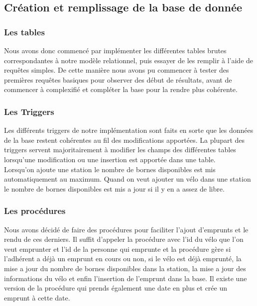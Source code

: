 \documentclass[10pt]{article}
\begin{document}
  \subsection{Création et remplissage de la base de donnée}\label{subsec:crea}
  \subsubsection{Les tables}
  Nous avons donc commencé par implémenter les différentes tables brutes correspondantes à notre modèle relationnel, puis essayer de les remplir à l'aide de requêtes simples. De cette manière nous avons pu commencer à tester des premières requêtes basiques pour observer des début de résultats, avant de commencer à complexifié et compléter la base pour la rendre plus cohérente.\\
  
  \subsubsection{Les Triggers}
  
  Les différents triggers de notre implémentation sont faits en sorte que les données de la base restent cohérentes au fil des modifications apportées. La plupart des triggers servent majoritairement à modifier les champs des différentes tables lorsqu'une modification ou une insertion est apportée dans une table.\\
  
  Lorsqu'on ajoute une station le nombre de bornes disponibles est mis automatiquement au maximum. 
  Quand on veut ajouter un vélo dans une station le nombre de bornes disponibles est mis a jour si il y en a assez de libre. 
  
  \subsubsection{Les procédures}
  Nous avons décidé de faire des procédures pour faciliter l'ajout d'emprunts et le rendu de ces derniers. Il suffit d'appeler la procédure avec l'id du vélo que l'on veut emprunter et l'id de la personne qui emprunte et la procédure gère si l'adhérent a déjà un emprunt en cours ou non, si le vélo est déjà emprunté, la mise a jour du nombre de bornes disponibles dans la station, la mise a jour des informations du vélo et enfin l'insertion de l'emprunt dans la base. 
  Il existe une version de la procédure qui prends également une date en plus et crée un emprunt à cette date. \\
  
\end{document}
